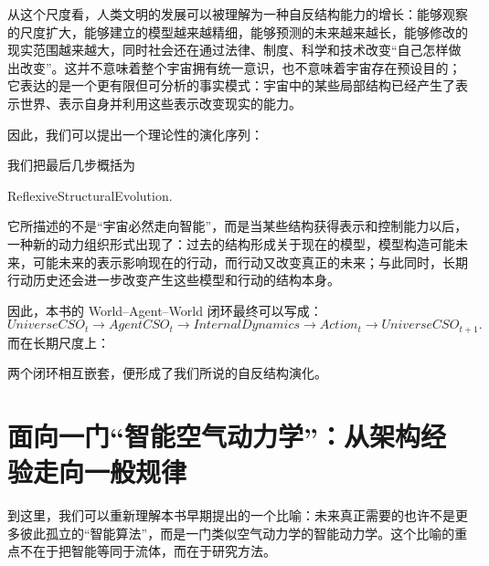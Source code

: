 从这个尺度看，人类文明的发展可以被理解为一种自反结构能力的增长：能够观察的尺度扩大，能够建立的模型越来越精细，能够预测的未来越来越长，能够修改的现实范围越来越大，同时社会还在通过法律、制度、科学和技术改变“自己怎样做出改变”。这并不意味着整个宇宙拥有统一意识，也不意味着宇宙存在预设目的；它表达的是一个更有限但可分析的事实模式：宇宙中的某些局部结构已经产生了表示世界、表示自身并利用这些表示改变现实的能力。

因此，我们可以提出一个理论性的演化序列：
\begin{statementbox}
\centering
{}
\end{statementbox}

我们把最后几步概括为
\begin{statementbox}
ReflexiveStructuralEvolution.
\end{statementbox}

它所描述的不是“宇宙必然走向智能”，而是当某些结构获得表示和控制能力以后，一种新的动力组织形式出现了：过去的结构形成关于现在的模型，模型构造可能未来，可能未来的表示影响现在的行动，而行动又改变真正的未来；与此同时，长期行动历史还会进一步改变产生这些模型和行动的结构本身。

因此，本书的 World--Agent--World 闭环最终可以写成：
\begin{equation}
\boxed{
UniverseCSO_t
\rightarrow
AgentCSO_t
\rightarrow
InternalDynamics
\rightarrow
Action_t
\rightarrow
UniverseCSO_{t+1}.
}
\end{equation}
而在长期尺度上：
\begin{statementbox}
\centering
{}
\end{statementbox}

两个闭环相互嵌套，便形成了我们所说的自反结构演化。

\section{面向一门“智能空气动力学”：从架构经验走向一般规律}

到这里，我们可以重新理解本书早期提出的一个比喻：未来真正需要的也许不是更多彼此孤立的“智能算法”，而是一门类似空气动力学的智能动力学。这个比喻的重点不在于把智能等同于流体，而在于研究方法。

